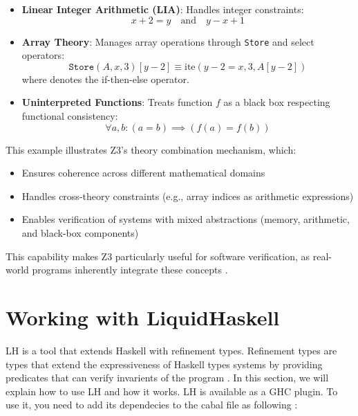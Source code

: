 \documentclass[]{rptuseminar}
\begin{document}
\begin{itemize}
    \item \textbf{Linear Integer Arithmetic (LIA)}: Handles integer constraints:
    \begin{equation*}
        x + 2 = y \quad \text{and} \quad y - x + 1
    \end{equation*}
    
    \item \textbf{Array Theory}: Manages array operations through \texttt{Store} and select operators:
    \begin{equation*}
        \texttt{Store}(A, x, 3)[y - 2] \equiv \text{ite}(y - 2 = x, 3, A[y - 2])
    \end{equation*}
    where  denotes the if-then-else operator.
    
    \item \textbf{Uninterpreted Functions}: Treats function $f$ as a black box respecting functional consistency:
    \begin{equation*}
        \forall a, b: (a = b) \implies (f(a) = f(b))
    \end{equation*}
\end{itemize}

This example illustrates Z3's theory combination mechanism, which:
\begin{itemize}
    \item Ensures coherence across different mathematical domains
    \item Handles cross-theory constraints (e.g., array indices as arithmetic expressions)
    \item Enables verification of systems with mixed abstractions (memory, arithmetic, and black-box components)
\end{itemize}

This capability makes Z3 particularly useful for software verification, as real-world programs inherently integrate these concepts \cite{nikolaj_bjorner_programming_nodate}.
\section{Working with LiquidHaskell}
\label{sec:lh}
LH is a tool that extends Haskell with refinement types. Refinement types are types that extend 
the expressiveness of Haskell types systems by providing predicates that can verify invarients of the program \cite{vazou_refinement_2014}.
In this section, we will explain how to use LH and how it works.
LH is available as a GHC plugin. To use it, you need to add its dependecies to the cabal file as following \cite{noauthor_ucsd-progsyslh-plugin-demo_2024}:
\end{document}

